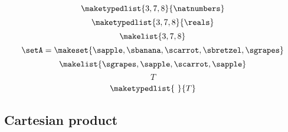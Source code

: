 \begin{forslides}
\begin{equation}\label{eq:slides_session2_41}
\maketypedlist{3, 7, 8}{\natnumbers}
\end{equation}
\begin{equation}\label{eq:slides_session2_42}
\maketypedlist{3, 7, 8}{\reals}
\end{equation}
 \begin{equation}\label{eq:slides_session2_43}
\makelist{3, 7, 8}
\end{equation}
\begin{equation}\label{eq:slides_session2_44}
\setA = \makeset{\sapple, \sbanana, \scarrot, \sbretzel, \sgrapes}
\end{equation}
 \begin{equation}\label{eq:slides_session2_45}
\makelist{\sgrapes, \sapple, \scarrot, \sapple}
\end{equation}
\begin{equation}\label{eq:slides_session2_46}
T
\end{equation}
 \begin{equation}\label{eq:slides_session2_47}
\maketypedlist{\ }{T}
\end{equation}

\subsection{Cartesian product}


\end{forslides}
